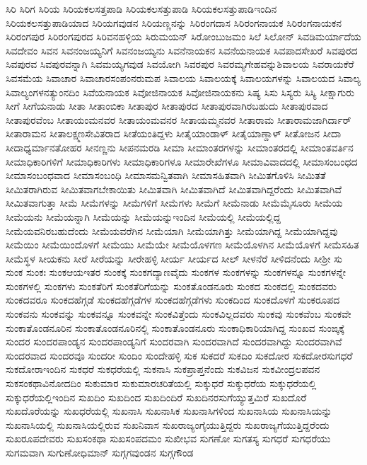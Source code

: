{ಸಿರಿ
ಸಿರಿಗ
ಸಿರಿಯ
ಸಿರಿಯಕಲಸತ್ತಪಾಡಿ
ಸಿರಿಯಕಲಸತ್ತುಪಾಡಿ
ಸಿರಿಯಕಲಸತ್ತುಪಾಡಿಇಂದಿನ
ಸಿರಿಯಕಲಸತ್ತುಪಾಡಿಯಾದ
ಸಿರಿಯಗವುಡನ
ಸಿರಿಯಣ್ಣನನ್ನು
ಸಿರಿರಂಗದಾಸ
ಸಿರಿರಂಗನಾಯಕ
ಸಿರಿರಂಗನಾಯಕನ
ಸಿರಿರಂಗಪುರ
ಸಿರಿರಂಗಪುರದ
ಸಿರಿವನಹಳ್ಳಿಯ
ಸಿರುಮಯನ್
ಸಿರೋಂಬುಜಮಂ
ಸಿಲೆ
ಸಿಲೋನ್
ಸಿವಡಿಮರ್ಯಾದೆಯ
ಸಿವದೇವಂ
ಸಿವನ
ಸಿವನಂಜಯ್ಯನಿಗೆ
ಸಿವನಂಜಯ್ಯನು
ಸಿವನೆನಾಯಕನ
ಸಿವನೆಯನಾಯಕ
ಸಿವಪಾದಸೇಖರೆ
ಸಿವಪುರದ
ಸಿವಪುರವ
ಸಿವಪುರವನ್ನಾಗಿ
ಸಿವಮಯ್ಯಗವುಡ
ಸಿವಯೋಗಿ
ಸಿವರಪುರ
ಸಿವರಮ್ಯಗೇಹವನ್ನುಶಿವಾಲಯ
ಸಿವರಾಯಕೆರೆ
ಸಿವಸಮೆಯ
ಸಿವಾಚಾರ
ಸಿವಾಚಾರಸಂಪಂನರುಮಪ
ಸಿವಾಲಯ
ಸಿವಾಲಯಕ್ಕೆ
ಸಿವಾಲಯಗಳನ್ನು
ಸಿವಾಲಯದ
ಸಿವಾಲ್ಯ
ಸಿವಾಲ್ಯಂಗಳನತ್ಯುಂನದಿಂ
ಸಿವೆಯನಾಯಕ
ಸಿವೋಜಿನಾಯಕ
ಸಿವೋಜಿನಾಯಕನು
ಸಿಷ್ಯ
ಸಿಸು
ಸಿಸ್ಯರು
ಸಿಸ್ಯಿ
ಸೀಕ್ಷಾಗುರು
ಸೀಗೆ
ಸೀಗೆಯನಾಡು
ಸೀತಾ
ಸೀತಾಂಬಿಕಾ
ಸೀತಾಪುರ
ಸೀತಾಪುರದ
ಸೀತಾಪುರವಾಗಿರಬಹುದು
ಸೀತಾಪುರವಾದ
ಸೀತಾಪುರವೆಂಬ
ಸೀತಾಯಂಮನವರ
ಸೀತಾಯಂಮವನರ
ಸೀತಾಯಮ್ಮನವರ
ಸೀತಾರಾಮ
ಸೀತಾರಾಮಜಾಗಿರ್ದಾರ್
ಸೀತಾರಾಮನ
ಸೀತಾಲಕ್ಷ್ಮಣಸೇವಿತರಾದ
ಸೀತೆಯಂತಿದ್ದಳು
ಸೀತೈಯಾಂಡಾಳ್
ಸೀತೈಯಾಣ್ಡಾಳ್
ಸೀತೋಜನ
ಸೀದಾ
ಸೀದಾಧ್ಯರ್ಮಾನತೋಹರ
ಸೀನಣ್ಣನು
ಸೀಪನಮರಡಿ
ಸೀಮಾ
ಸೀಮಾಂತರಗಳನ್ನು
ಸೀಮಾಂತರದಲ್ಲಿ
ಸೀಮಾಂತವರ್ತಿನ
ಸೀಮಾಧಿಕಾರಿಗಳಿಗೆ
ಸೀಮಾಧಿಕಾರಿಗಳು
ಸೀಮಾಧಿಕಾರಿಗಳೂ
ಸೀಮಾರೇಖೆಗಳೂ
ಸೀಮಾವಿವಾದದಲ್ಲಿ
ಸೀಮಾಸಂಬಂಧದ
ಸೀಮಾಸಂಬಂಧವಾದ
ಸೀಮಾಸಂಬಂಧಿ
ಸೀಮಾಸಮನ್ವಿತವಾಗಿ
ಸೀಮಾಸಹಿತವಾಗಿ
ಸೀಮಿತಗೊಳಿಸಿ
ಸೀಮಿತತೆ
ಸೀಮಿತರಾಗಿರುವ
ಸೀಮಿತವಾಗಬೇಕಾಯಿತು
ಸೀಮಿತವಾಗಿ
ಸೀಮಿತವಾಗಿದೆ
ಸೀಮಿತವಾಗಿದ್ದರೆಂದು
ಸೀಮಿತವಾಗಿವೆ
ಸೀಮಿತವಾಗುತ್ತಾ
ಸೀಮೆ
ಸೀಮೆಗಳನ್ನು
ಸೀಮೆಗಳಿಗೆ
ಸೀಮೆಗಳು
ಸೀಮೆಗೆ
ಸೀಮೆನಾಡು
ಸೀಮೆಮೈಸೂರು
ಸೀಮೆಯ
ಸೀಮೆಯನು
ಸೀಮೆಯನ್ನಾಗಿ
ಸೀಮೆಯನ್ನು
ಸೀಮೆಯನ್ನುಇಂದಿನ
ಸೀಮೆಯಲ್ಲಿ
ಸೀಮೆಯಲ್ಲಿದ್ದ
ಸೀಮೆಯವನಿರಬಹುದೆಂದು
ಸೀಮೆಯವರೆಗಿನ
ಸೀಮೆಯಾಗಿ
ಸೀಮೆಯಾಗಿತ್ತು
ಸೀಮೆಯಾಗಿದ್ದ
ಸೀಮೆಯಾಗಿದ್ದವು
ಸೀಮೆಯಿಂ
ಸೀಮೆಯಿಂದೊಳಗೆ
ಸೀಮೆಯು
ಸೀಮೆಯೇ
ಸೀಮೆಯೊಳಗಣ
ಸೀಮೆಯೊಳಗಿನ
ಸೀಮೆಯೊಳಗೆ
ಸೀಮೆಸಹಿತ
ಸೀಮೆಸ್ಥಳ
ಸೀಯಕನು
ಸೀರೆ
ಸೀರೆಯನ್ನು
ಸೀರೇಹಳ್ಳಿ
ಸೀರ್ಯ
ಸೀರ್ಯದ
ಸೀಲ್
ಸೀಳನೆರೆ
ಸೀಳಿದನೆಂದು
ಸೀಶ್ರೀ
ಸು
ಸುಂಕ
ಸುಂಕಃ
ಸುಂಕಆಯಇತರ
ಸುಂಕಕ್ಕೆ
ಸುಂಕಗದ್ಯಾಣವೈದು
ಸುಂಕಗಳ
ಸುಂಕಗಳನ್ನು
ಸುಂಕಗಳನ್ನೂ
ಸುಂಕಗಳನ್ನೇ
ಸುಂಕಗಳಲ್ಲಿ
ಸುಂಕಗಳು
ಸುಂಕತೆರಿಗೆ
ಸುಂಕತೆರಿಗೆಯನ್ನು
ಸುಂಕತೊಂಡನೂರು
ಸುಂಕದ
ಸುಂಕದಲ್ಲಿ
ಸುಂಕದವರು
ಸುಂಕದವರೂ
ಸುಂಕದಹೆಗ್ಗಡೆ
ಸುಂಕದಹೆಗ್ಗಡೆಗಳ
ಸುಂಕದಹೆಗ್ಗಡೆಗಳು
ಸುಂಕದಿಂದ
ಸುಂಕದೊಳಗೆ
ಸುಂಕರೂಪದ
ಸುಂಕವನು
ಸುಂಕವನ್ನು
ಸುಂಕವನ್ನೂ
ಸುಂಕವನ್ನೇ
ಸುಂಕವಿತ್ತೆಂದು
ಸುಂಕವಿಲ್ಲದವರು
ಸುಂಕವು
ಸುಂಕವೆಂಬ
ಸುಂಕವೇ
ಸುಂಕಾತೊಂಡನೂರಿನ
ಸುಂಕಾತೊಂಡನೂರಿನಲ್ಲಿ
ಸುಂಕಾತೊಂಡನೂರು
ಸುಂಕಾಧಿಕಾರಿಯಾಗಿದ್ದ
ಸುಂಖವ
ಸುಂಙ್ಕಕ್ಕೆ
ಸುಂದರ
ಸುಂದರಪಾಂಡ್ಯನ
ಸುಂದರಪಾಂಡ್ಯನಿಗೆ
ಸುಂದರವಾಗಿ
ಸುಂದರವಾಗಿದೆ
ಸುಂದರವಾಗಿದ್ದು
ಸುಂದರವಾಗಿವೆ
ಸುಂದರವಾದ
ಸುಂದರವೂ
ಸುಂದರೀ
ಸುಂದಿಂ
ಸುಂದೇಹಳ್ಳಿ
ಸುಕ
ಸುಕದರೆ
ಸುಕದಿಂ
ಸುಕದೋರ
ಸುಕದೋರಸುಗಧರೆ
ಸುಕದೋರಾಇಂದಿನ
ಸುಕಧರೆ
ಸುಕಧರೆಯಲ್ಲಿ
ಸುಕನಾಸಿ
ಸುಕಪ್ರಾಪ್ತನೆಂದು
ಸುಕವಿಜನ
ಸುಕವೀಂದ್ರಲಪವನ
ಸುಕಸಂಕಥಾವಿನೋದದಿಂ
ಸುಕುಮಾರ
ಸುಕುಮಾರಚರಿತೆಯಲ್ಲಿ
ಸುಕ್ಕುಧರೆ
ಸುಕ್ಕುಧರೆಯ
ಸುಕ್ಕುಧರೆಯಲ್ಲಿ
ಸುಕ್ಕುಧರೆಯಲ್ಲಿಇಂದಿನ
ಸುಖದಿಂ
ಸುಖದಿಂದ
ಸುಖದಿಂದಿರೆ
ಸುಖದಿನರಸುಗೆಯ್ಯುತ್ತಮಿರೆ
ಸುಖದೊರೆ
ಸುಖದೊರೆಯನ್ನು
ಸುಖಧರೆಯಲ್ಲಿ
ಸುಖನಾಸಿ
ಸುಖನಾಸಿಕ
ಸುಖನಾಸಿಗಳಿಂದ
ಸುಖನಾಸಿಯ
ಸುಖನಾಸಿಯನ್ನು
ಸುಖನಾಸಿಯಲ್ಲಿ
ಸುಖನಾಸಿಯಲ್ಲಿರುವ
ಸುಖನಿವಾಸ
ಸುಖರಾಜ್ಯಂಗೈಯುತ್ತಿದ್ದರು
ಸುಖರಾಜ್ಯಗೆಯುತ್ತಿದ್ದರೆಂದು
ಸುಖರೂಪದೇವರು
ಸುಖಸಂಕಥಾ
ಸುಖಸಂಪದಮಂ
ಸುಖೀಭವ
ಸುಗಣೋ
ಸುಗತಸ್ಯ
ಸುಗಧರೆ
ಸುಗಧರೆಯು
ಸುಗಮವಾಗಿ
ಸುಗುಣೋಧಿಮಾನ್
ಸುಗ್ಗಗವುಂಡನ
ಸುಗ್ಗಗೌಂಡ
}
